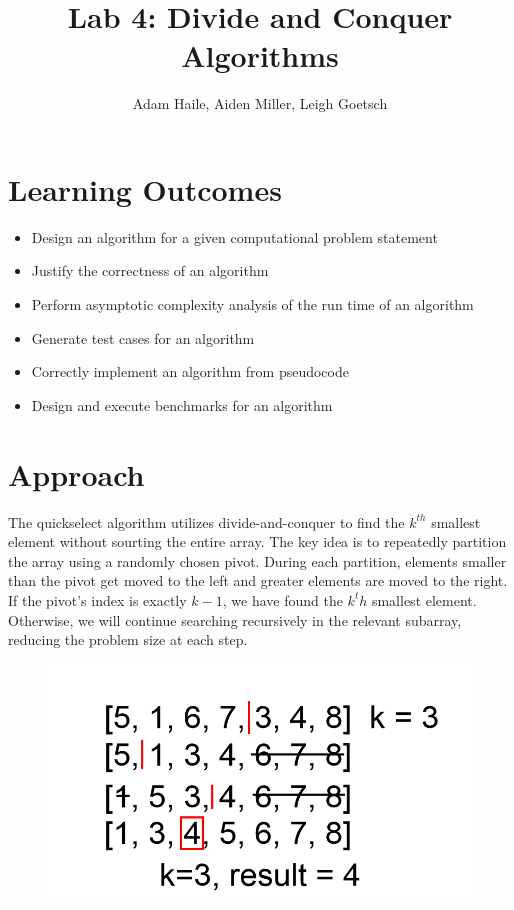 \documentclass{labReport}
\title{Lab 4: Divide and Conquer Algorithms}
\author{Adam Haile, Aiden Miller, Leigh Goetsch}
\begin{document}
\maketitle

\section*{Learning Outcomes}
\begin{itemize}
    \item Design an algorithm for a given computational problem statement
    \item Justify the correctness of an algorithm
    \item Perform asymptotic complexity analysis of the run time of an algorithm
    \item Generate test cases for an algorithm
    \item Correctly implement an algorithm from pseudocode
    \item Design and execute benchmarks for an algorithm
\end{itemize}


\newpage



\section{Approach}
The quickselect algorithm utilizes divide-and-conquer to find the $k^{th}$ smallest element without sourting the entire array. The key idea is to repeatedly partition the array using a randomly chosen pivot. During each partition, elements smaller than the pivot get moved to the left and greater elements are moved to the right. If the pivot's index is exactly $k - 1$, we have found the $k^th$ smallest element. Otherwise, we will continue searching recursively in the relevant subarray, reducing the problem size at each step. 
\begin{figure}
     \centering
     \includegraphics[width=1\linewidth]{Quickselect.png}
\end{figure} 
\end{document}
